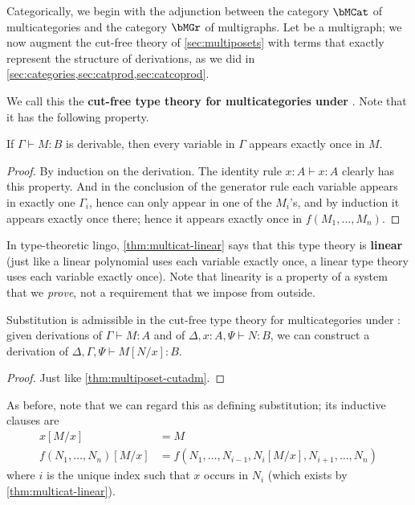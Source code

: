 \documentclass{book}
\let\types\vdash
\begin{document}
Categorically, we begin with the adjunction between the category $\bMCat$ of multicategories and the category $\bMGr$ of multigraphs.
Let \cG be a multigraph; we now augment the cut-free theory of \cref{sec:multiposets} with terms that exactly represent the structure of derivations, as we did in \cref{sec:categories,sec:catprod,sec:catcoprod}.
We call this the \textbf{cut-free type theory for multicategories under \cG}.
Note that it has the following property.

\begin{lem}\label{thm:multicat-linear}
  If $\Gamma\types M:B$ is derivable, then every variable in $\Gamma$ appears exactly once in $M$.
\end{lem}
\begin{proof}
  By induction on the derivation.
  The identity rule $x:A\types x:A$ clearly has this property.
  And in the conclusion of the generator rule each variable appears in exactly one $\Gamma_i$, hence can only appear in one of the $M_i$'s, and by induction it appears exactly once there; hence it appears exactly once in $f(M_1,\dots,M_n)$.
\end{proof}

In type-theoretic lingo, \cref{thm:multicat-linear} says that this type theory is \textbf{linear} (just like a linear polynomial uses each variable exactly once, a linear type theory uses each variable exactly once).
Note that linearity is a property of a system that we \emph{prove}, not a requirement that we impose from outside.

\begin{thm}\label{thm:multicat-subadm}
  Substitution is admissible in the cut-free type theory for multicategories under \cG: given derivations of $\Gamma\types M:A$ and of $\Delta,x:A,\Psi\types N:B$, we can construct a derivation of $\Delta,\Gamma,\Psi\types M[N/x]:B$.
\end{thm}
\begin{proof}
  Just like \cref{thm:multiposet-cutadm}.
\end{proof}

As before, note that we can regard this as defining substitution; its inductive clauses are
\begin{align*}
  x[M/x] &= M\\
  f(N_1,\dots,N_n)[M/x] &= f(N_1,\dots,N_{i-1},N_i[M/x],N_{i+1},\dots,N_n)
\end{align*}
where $i$ is the unique index such that $x$ occurs in $N_i$ (which exists by \cref{thm:multicat-linear}).
\end{document}
